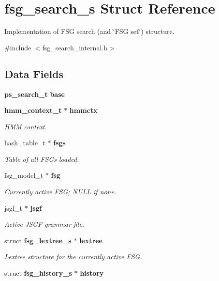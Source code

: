 \section{fsg\-\_\-search\-\_\-s Struct Reference}
\label{structfsg__search__s}


Implementation of F\-S\-G search (and \char`\"{}\-F\-S\-G set\char`\"{}) structure.  




{\ttfamily \#include $<$fsg\-\_\-search\-\_\-internal.\-h$>$}

\subsection*{Data Fields}
\begin{DoxyCompactItemize}
\item 
{\bf ps\-\_\-search\-\_\-t} {\bfseries base}\label{structfsg__search__s_a75f0e3fd5396d62616b9f84eab7ea355}

\item 
{\bf hmm\-\_\-context\-\_\-t} $\ast$ {\bf hmmctx}
\begin{DoxyCompactList}\small\item\em H\-M\-M context. \end{DoxyCompactList}\item 
hash\-\_\-table\-\_\-t $\ast$ {\bf fsgs}\label{structfsg__search__s_a3d31a88c719aaf36ecae5c96ecddbd73}

\begin{DoxyCompactList}\small\item\em Table of all F\-S\-Gs loaded. \end{DoxyCompactList}\item 
fsg\-\_\-model\-\_\-t $\ast$ {\bf fsg}
\begin{DoxyCompactList}\small\item\em Currently active F\-S\-G; N\-U\-L\-L if none. \end{DoxyCompactList}\item 
jsgf\-\_\-t $\ast$ {\bf jsgf}
\begin{DoxyCompactList}\small\item\em Active J\-S\-G\-F grammar file. \end{DoxyCompactList}\item 
struct {\bf fsg\-\_\-lextree\-\_\-s} $\ast$ {\bf lextree}\label{structfsg__search__s_ac2c756ff6c1a2f1059011756d22441f8}

\begin{DoxyCompactList}\small\item\em Lextree structure for the currently active F\-S\-G. \end{DoxyCompactList}\item 
struct {\bf fsg\-\_\-history\-\_\-s} $\ast$ {\bf history}\label{structfsg__search__s_abc949ccaab380bcf5b452d1cac54469b}


\end{DoxyCompactItemize}
